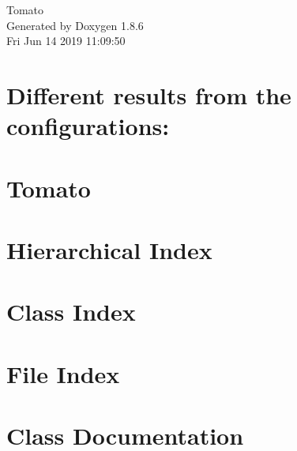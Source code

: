 \documentclass[twoside]{book}
\newcommand{\clearemptydoublepage}{%
  \newpage{\pagestyle{empty}\cleardoublepage}%
}
\begin{document}
\hypersetup{pageanchor=false}
\begin{titlepage}
\vspace*{7cm}
\begin{center}%
{\Large Tomato }\\
\vspace*{1cm}
{\large Generated by Doxygen 1.8.6}\\
\vspace*{0.5cm}
{\small Fri Jun 14 2019 11:09:50}\\
\end{center}
\end{titlepage}
\clearemptydoublepage
\tableofcontents
\clearemptydoublepage
{}
\hypersetup{pageanchor=true}

\chapter{Different results from the configurations\-:}
\label{md_notepad}
\hypertarget{md_notepad}{}

\chapter{Tomato}
\label{md__r_e_a_d_m_e}
\hypertarget{md__r_e_a_d_m_e}{}

\chapter{Hierarchical Index}

\chapter{Class Index}

\chapter{File Index}

\chapter{Class Documentation}
























\end{document}
